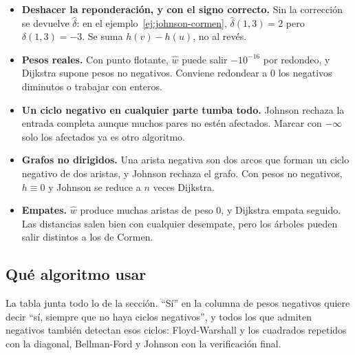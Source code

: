 \documentclass[11pt,letterpaper]{article}
\begin{document}
\begin{ojo}[breakable]
  \begin{itemize}[itemsep=0.2em, leftmargin=1.2em]
    \item \textbf{Deshacer la reponderación, y con el signo correcto.}
          Sin la corrección se devuelve $\hat{\delta}$: en el
          ejemplo~\ref{ej:johnson-cormen},
          $\hat{\delta}(1, 3) = 2$ pero $\delta(1, 3) = -3$. Se suma
          $h(v) - h(u)$, no al revés.
    \item \textbf{Pesos reales.} Con punto flotante, $\hat{w}$ puede
          salir $-10^{-16}$ por redondeo, y Dijkstra supone pesos no
          negativos. Conviene redondear a $0$ los negativos diminutos
          o trabajar con enteros.
    \item \textbf{Un ciclo negativo en cualquier parte tumba todo.}
          Johnson rechaza la entrada completa aunque muchos pares no
          estén afectados. Marcar con $-\infty$ solo los afectados ya
          es otro algoritmo.
    \item \textbf{Grafos no dirigidos.} Una arista negativa son dos
          arcos que forman un ciclo negativo de dos aristas, y Johnson
          rechaza el grafo. Con pesos no negativos, $h \equiv 0$ y
          Johnson se reduce a $n$ veces Dijkstra.
    \item \textbf{Empates.} $\hat{w}$ produce muchas aristas de peso
          $0$, y Dijkstra empata seguido. Las distancias salen bien
          con cualquier desempate, pero los árboles pueden salir
          distintos a los de Cormen.
  \end{itemize}
\end{ojo}


\subsection*{Qué algoritmo usar}

La tabla junta todo lo de la sección. ``Sí'' en la columna de pesos
negativos quiere decir ``sí, siempre que no haya ciclos negativos'', y
todos los que admiten negativos también detectan esos ciclos:
Floyd-Warshall y los cuadrados repetidos con la diagonal, Bellman-Ford
y Johnson con la verificación final.
\end{document}
